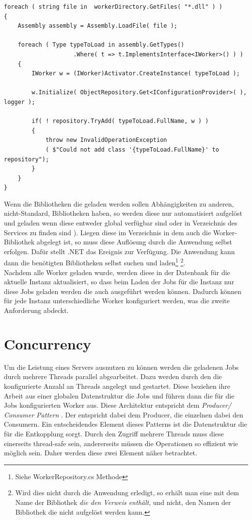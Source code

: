 \begin{lstlisting}[caption={Dynamic Loading, siehe WorkerRepository.cs - LoadAllWorkers()},label={lst:dynamicloading},captionpos=b]
foreach ( string file in  workerDirectory.GetFiles( "*.dll" ) )
{
	Assembly assembly = Assembly.LoadFile( file );

	foreach ( Type typeToLoad in assembly.GetTypes()
					.Where( t => t.ImplementsInterface<IWorker>() ) )
	{
		IWorker w = (IWorker)Activator.CreateInstance( typeToLoad );

		w.Initialize( ObjectRepository.Get<IConfigurationProvider>( ), logger );

		if( ! repository.TryAdd( typeToLoad.FullName, w ) )
		{
			throw new InvalidOperationException
			( $"Could not add class '{typeToLoad.FullName}' to repository");
		}
	}
}
\end{lstlisting}
Wenn die Bibliotheken die geladen werden sollen Abhängigkeiten zu anderen, nicht-Standard, Bibliotheken haben, so werden diese nur automatisiert aufgelöst und geladen wenn diese entweder global verfügbar sind oder in Verzeichnis des Services zu finden sind \parencite[S. 42ff]{box}). Liegen diese im Verzeichnis in dem auch die Worker-Bibliothek abgelegt ist, so muss diese Auflösung durch die Anwendung selbst erfolgen. Dafür stellt .NET das Ereignis  zur Verfügung. Die Anwendung kann dann die benötigten Bibliotheken selbst suchen und laden\footnote{Siehe WorkerRepository.cs Methode } \footnote{Wird dies nicht durch die Anwendung erledigt, so erhält man eine  mit dem Name der Bibliothek \emph{die den Verweis enthält}, und nicht, den Namen der Bibliothek die nicht aufgelöst werden kann. }.
\\Nachdem alle Worker geladen wurde, werden diese in der Datenbank für die aktuelle Instanz aktualisiert, so dass beim Laden der Jobs für die Instanz nur diese Jobs geladen werden die auch ausgeführt werden können. Dadurch können für jede Instanz unterschiedliche Worker konfiguriert werden, was die zweite Anforderung abdeckt.
\section{Concurrency}
Um die Leistung eines Servers ausnutzen zu können werden die geladenen Jobs durch mehrere Threads parallel abgearbeitet. Dazu werden durch den  die konfigurierte Anzahl an Threads angelegt und gestartet. Diese beziehen ihre Arbeit aus einer globalen Datenstruktur die Jobs und führen dann die für die Jobs konfigurierten Worker aus. Diese Architektur entspricht dem \emph{Producer/ Consumer Pattern} \parencite[S. 163ff]{jthreads}. Der  entspricht dabei dem Producer, die einzelnen  dabei den Consumern. Ein entscheidendes Element dieses Patterns ist die Datenstruktur die für die Entkopplung sorgt. Durch den Zugriff mehrere Threads muss diese einerseits thread-safe sein, andererseits müssen die Operationen so effizient wie möglich sein. Daher werden diese zwei Element näher betrachtet.
